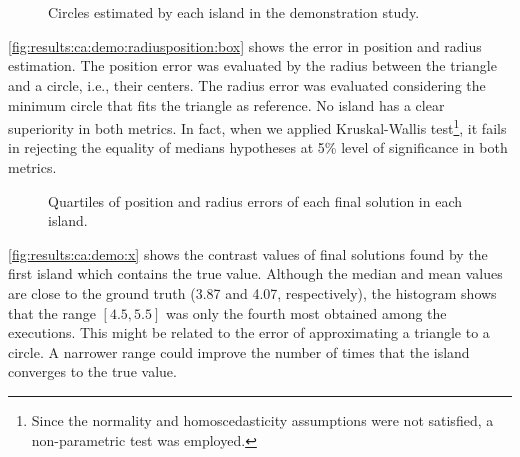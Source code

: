 			\begin{figure}
				\centering
				 \\
				 \\
				\caption[CA's demonstration study: circles estimated by each island in the demonstration study.]{Circles estimated by each island in the demonstration study.}
				\label{fig:results:ca:demo:radiusposition}
			\end{figure}
		
			\autoref{fig:results:ca:demo:radiusposition:box} shows the error in position and radius estimation. The position error was evaluated by the radius between the triangle and a circle, i.e., their centers. The radius error was evaluated considering the minimum circle that fits the triangle as reference. No island has a clear superiority in both metrics. In fact, when we applied Kruskal-Wallis test\footnote{Since the normality and homoscedasticity assumptions were not satisfied, a non-parametric test was employed.}, it fails in rejecting the equality of medians hypotheses at 5\% level of significance in both metrics.
			
			\begin{figure}
				\centering
				\caption[CA's demonstration study: position and radius errors quartiles.]{Quartiles of position and radius errors of each final solution in each island.}
				\label{fig:results:ca:demo:radiusposition:box}
			\end{figure}
			
			\autoref{fig:results:ca:demo:x} shows the contrast values of final solutions found by the first island which contains the true value. Although the median and mean values are close to the ground truth (3.87 and 4.07, respectively), the histogram shows that the range $[4.5,5.5]$ was only the fourth most obtained among the executions. This might be related to the error of approximating a triangle to a circle. A narrower range could improve the number of times that the island converges to the true value.
			
